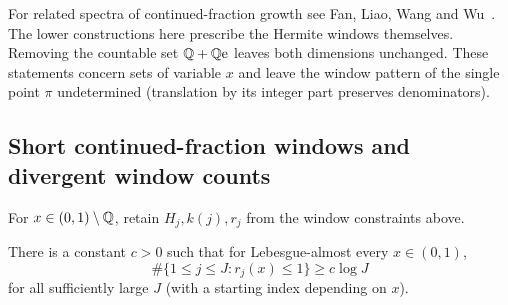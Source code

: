 For related spectra of continued-fraction growth see Fan, Liao, Wang
and Wu~\cite{FLLW}. The lower constructions here prescribe the
Hermite windows themselves. Removing the countable set $\mathbb{Q}+\mathbb{Q}\mathrm{e}$
leaves both dimensions unchanged. These statements concern sets of
variable $x$ and leave the window pattern of the single point $\pi$
undetermined (translation by its integer part preserves denominators).

\subsection{Short continued-fraction windows and divergent window counts}

For $x\in(0,1)\setminus\mathbb{Q}$, retain $H_j,k(j),r_j$ from the window
constraints above.

\begin{theorem}\label{thm:short-ae}
There is a constant $c>0$ such that for Lebesgue-almost every $x\in(0,1)$,
\[
 \#\{1\le j\le J:r_j(x)\le1\}\ge c\log J
\]
for all sufficiently large $J$ (with a starting index depending on $x$).
\end{theorem}

